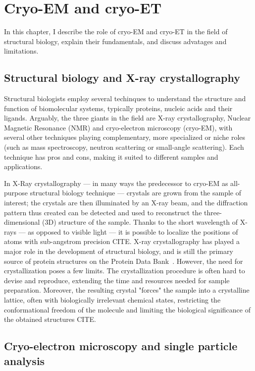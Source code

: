 \chapter{Cryo-EM and cryo-ET}

In this chapter, I describe the role of cryo-EM and cryo-ET in the field of structural biology, explain their fundamentals, and discuss advatages and limitations.

\section{Structural biology and X-ray crystallography}

Structural biologists employ several techinques to understand the structure and function of biomolecular systems, typically proteins, nucleic acids and their ligands. Arguably, the three giants in the field are X-ray crystallography, Nuclear Magnetic Resonance (NMR) and cryo-electron microscopy (cryo-EM), with several other techniques playing complementary, more specialized or niche roles (such as mass spectroscopy, neutron scattering or small-angle scattering). Each technique has pros and cons, making it suited to different samples and applications.

In X-Ray crystallography --- in many ways the predecessor to cryo-EM as all-purpose structural biology technique --- crystals are grown from the sample of interest; the crystals are then illuminated by an X-ray beam, and the diffraction pattern thus created can be detected and used to reconstruct the three-dimensional (3D) structure of the sample. Thanks to the short wavelength of X-rays --- as opposed to visible light --- it is possible to localize the positions of atoms with sub-angstrom precision CITE.
X-ray crystallography has played a major role in the development of structural biology, and is still the primary source of protein structures on the Protein Data Bank~\cite{bermanProteinDataBank2000,bermanAnnouncingWorldwideProtein2003}. However, the need for crystallization poses a few limits. The crystallization procedure is often hard to devise and reproduce, extending the time and resources needed for sample preparation. Moreover, the resulting crystal "forces" the sample into a crystalline lattice, often with biologically irrelevant chemical states, restricting the conformational freedom of the molecule and limiting the biological significance of the obtained structures CITE.

\section{Cryo-electron microscopy and single particle analysis}

